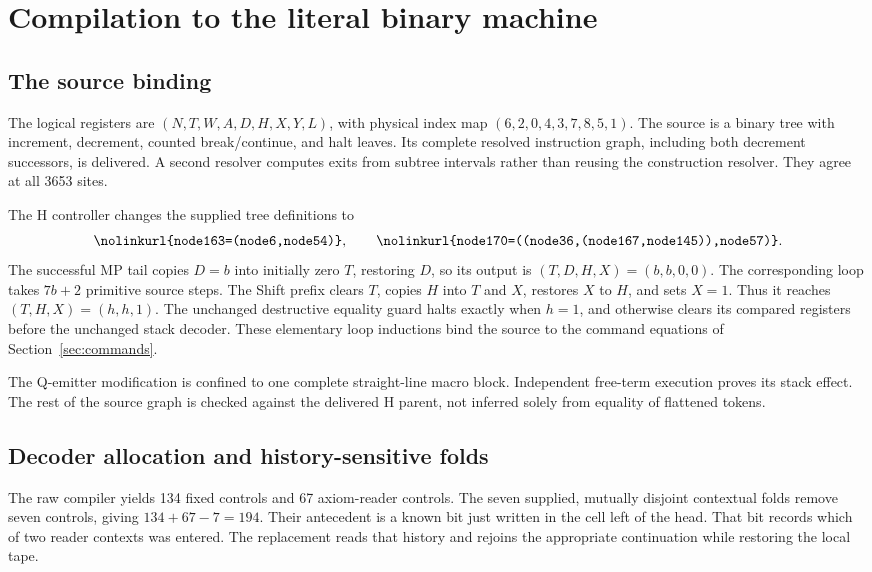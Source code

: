\documentclass[11pt,letterpaper]{article}
\newcommand{\file}[1]{\texttt{\nolinkurl{#1}}}
\begin{document}
\section{Compilation to the literal binary machine}
\label{sec:physical}

\subsection{The source binding}
The logical registers are $(N,T,W,A,D,H,X,Y,L)$, with physical index map
$(6,2,0,4,3,7,8,5,1)$. The source is a binary tree with increment,
decrement, counted break/continue, and halt leaves. Its complete resolved
instruction graph, including both decrement successors, is delivered.
A second resolver computes exits from subtree intervals rather than
reusing the construction resolver. They agree at all 3653 sites.

The H controller changes the supplied tree definitions to
\[
 \file{node163=(node6,node54)},\qquad
 \file{node170=((node36,(node167,node145)),node57)}.
\]
The successful MP tail copies $D=b$ into initially zero $T$, restoring $D$,
so its output is $(T,D,H,X)=(b,b,0,0)$. The corresponding loop takes $7b+2$
primitive source steps. The Shift prefix clears $T$, copies $H$ into $T$
and $X$, restores $X$ to $H$, and sets $X=1$. Thus it reaches
$(T,H,X)=(h,h,1)$. The unchanged destructive equality guard halts exactly
when $h=1$, and otherwise clears its compared registers before the
unchanged stack decoder. These elementary loop inductions bind the source
to the command equations of Section~\ref{sec:commands}.

The Q-emitter modification is confined to one complete straight-line
macro block. Independent free-term execution proves its stack effect.
The rest of the source graph is checked against the delivered H parent,
not inferred solely from equality of flattened tokens.

\subsection{Decoder allocation and history-sensitive folds}
The raw compiler yields 134 fixed controls and 67 axiom-reader controls.
The seven supplied, mutually disjoint contextual folds remove seven
controls, giving $134+67-7=194$. Their antecedent is a known bit just
written in the cell left of the head. That bit records which of two
reader contexts was entered. The replacement reads that history and
rejoins the appropriate continuation while restoring the local tape.
\end{document}
